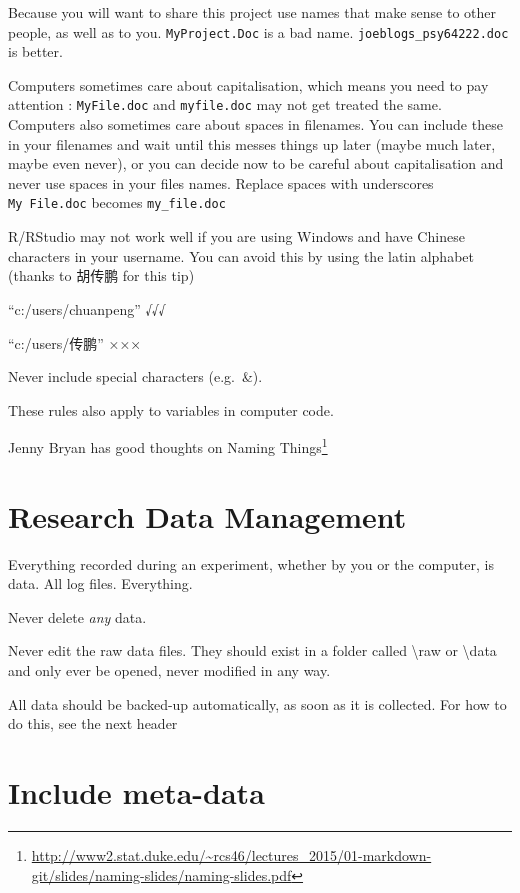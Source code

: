 \documentclass[
  12pt,
  a5paper,
]{book}
\DeclareRobustCommand{\href}[2]{#2\footnote{\url{#1}}}
\begin{document}
Because you will want to share this project use names that make sense to other people, as well as to you. \texttt{MyProject.Doc} is a bad name. \texttt{joeblogs\_psy64222.doc} is better.

Computers sometimes care about capitalisation, which means you need to pay attention : \texttt{MyFile.doc} and \texttt{myfile.doc} may not get treated the same. Computers also sometimes care about spaces in filenames. You can include these in your filenames and wait until this messes things up later (maybe much later, maybe even never), or you can decide now to be careful about capitalisation and never use spaces in your files names. Replace spaces with underscores \texttt{My\ File.doc} becomes \texttt{my\_file.doc}

R/RStudio may not work well if you are using Windows and have Chinese characters in your username. You can avoid this by using the latin alphabet (thanks to 胡传鹏 for this tip)

``c:/users/chuanpeng'' √√√

``c:/users/传鹏'' ×××

Never include special characters (e.g.~\&).

These rules also apply to variables in computer code.

Jenny Bryan has good thoughts on \href{http://www2.stat.duke.edu/~rcs46/lectures_2015/01-markdown-git/slides/naming-slides/naming-slides.pdf}{Naming Things}

\hypertarget{research-data-management}{%
\section{Research Data Management}\label{research-data-management}}

Everything recorded during an experiment, whether by you or the computer, is data. All log files. Everything.

Never delete \emph{any} data.

Never edit the raw data files. They should exist in a folder called \textbackslash raw or \textbackslash data and only ever be opened, never modified in any way.

All data should be backed-up automatically, as soon as it is collected. For how to do this, see the next header

\hypertarget{include-meta-data}{%
\section{Include meta-data}\label{include-meta-data}}
\end{document}
